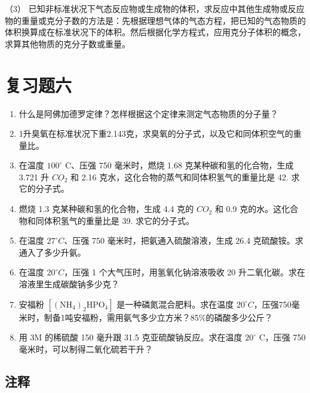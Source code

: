 （3）
已知非标准状况下气态反应物或生成物的体积，求反应中其他生成物或反应物的重量或克分子数的方法是：先根据理想气体的气态方程，把已知的气态物质的体积换算成在标准状况下的体积。然后根据化学方程式，应用克分子体积的概念，求算其他物质的克分子数或重量。

\section{复习题六}

\begin{enumerate}
\item
  什么是阿佛加德罗定律？怎样根据这个定律来测定气态物质的分子量？
\item
  1升臭氧在标准状况下重2.143克，求臭氧的分子式，以及它和同体积空气的重量比。
\item
  在温度 \(100^{\circ}\) C、压强 750 毫米时，燃烧 1.68
  克某种碳和氢的化合物，生成 3.721 升 \(CO_{2}\) 和 2.16
  克水，这化合物的蒸气和同体积氢气的重量比是 42. 求它的分子式。
\item
  燃烧 1.3 克某种碳和氢的化合物，生成 4.4 克的 \(CO_{2}\) 和 0.9
  克的水。这化合物和同体积氢气的重量比是 39. 求它的分子式。
\item
  在温度 \(27^{\circ}C\)、压强 750 毫米时，把氨通入硫酸溶液，生成 26.4
  克硫酸铵。求通入了多少升氨。
\item
  在温度 \(20^{\circ}C\)，压强 1 个大气压时，用氢氧化钠溶液吸收 20
  升二氧化碳。求在溶液里生成碳酸钠多少克？
\item
  安福粉
  \(\left[\left(\mathrm{NH}_{4}\right)_{2}\mathrm{HPO}_{4}\right]\)
  是一种磷氮混合肥料。求在温度
  \(20^{\circ}C\)，压强750毫米时，制备1吨安福粉，需用氨气多少立方米？85\%的磷酸多少公斤？
\item
  用 3M 的稀硫酸 150 毫升跟 31.5 克亚硫酸钠反应。求在温度 \(20^{\circ}\)
  C，压强 750 毫米时，可以制得二氧化硫若干升？
\end{enumerate}

\subsection{注释}

